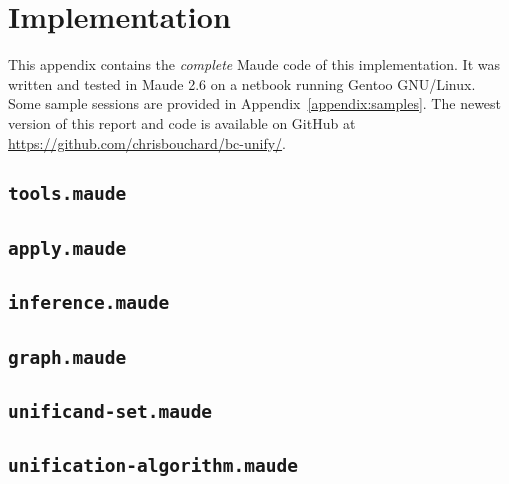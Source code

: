 \documentclass[11pt]{article}
\newcommand{\TitleListing}[1]{\texorpdfstring{\lstinline|#1|}{#1}}
\begin{document}
\newpage
\section{Implementation}\label{appendix:implementation}

This appendix contains the \emph{complete} Maude code of this implementation.
It was written and tested in Maude 2.6 on a netbook running Gentoo GNU/Linux.
Some sample sessions are provided in Appendix~\ref{appendix:samples}. The
newest version of this report and code is available on GitHub at
\url{https://github.com/chrisbouchard/bc-unify/}.

\subsection{\TitleListing{tools.maude}}
\label{subappendix:tools-mod}

\clearpage

\subsection{\TitleListing{apply.maude}}
\label{subappendix:apply-mod}

\clearpage

\subsection{\TitleListing{inference.maude}}
\label{subappendix:inference-mod}

\clearpage

\subsection{\TitleListing{graph.maude}}
\label{subappendix:graph-mod}

\clearpage

\subsection{\TitleListing{unificand-set.maude}}
\label{subappendix:unificand-set-mod}

\clearpage

\subsection{\TitleListing{unification-algorithm.maude}}
\label{subappendix:unif-alg-theory}

\clearpage
\end{document}
